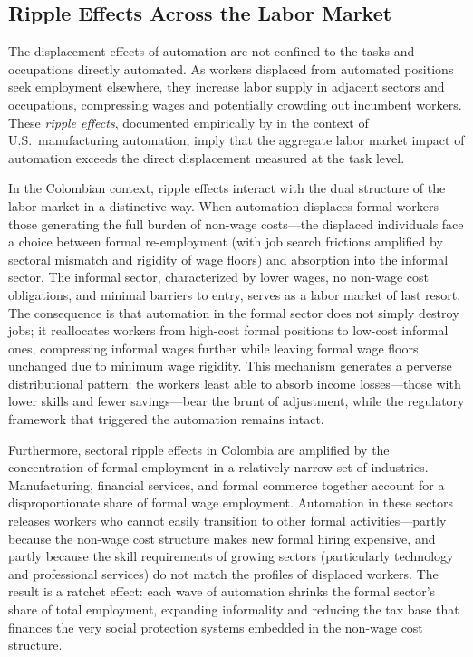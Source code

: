\documentclass{article}
\begin{document}
\subsection{Ripple Effects Across the Labor Market}
\label{subsec:ripples}

The displacement effects of automation are not confined to the tasks and occupations directly automated. As workers displaced from automated positions seek employment elsewhere, they increase labor supply in adjacent sectors and occupations, compressing wages and potentially crowding out incumbent workers. These \textit{ripple effects}, documented empirically by \cite{acemoglu2020robots} in the context of U.S.\ manufacturing automation, imply that the aggregate labor market impact of automation exceeds the direct displacement measured at the task level.

In the Colombian context, ripple effects interact with the dual structure of the labor market in a distinctive way. When automation displaces formal workers---those generating the full burden of non-wage costs---the displaced individuals face a choice between formal re-employment (with job search frictions amplified by sectoral mismatch and rigidity of wage floors) and absorption into the informal sector. The informal sector, characterized by lower wages, no non-wage cost obligations, and minimal barriers to entry, serves as a labor market of last resort. The consequence is that automation in the formal sector does not simply destroy jobs; it reallocates workers from high-cost formal positions to low-cost informal ones, compressing informal wages further while leaving formal wage floors unchanged due to minimum wage rigidity. This mechanism generates a perverse distributional pattern: the workers least able to absorb income losses---those with lower skills and fewer savings---bear the brunt of adjustment, while the regulatory framework that triggered the automation remains intact.

Furthermore, sectoral ripple effects in Colombia are amplified by the concentration of formal employment in a relatively narrow set of industries. Manufacturing, financial services, and formal commerce together account for a disproportionate share of formal wage employment. Automation in these sectors releases workers who cannot easily transition to other formal activities---partly because the non-wage cost structure makes new formal hiring expensive, and partly because the skill requirements of growing sectors (particularly technology and professional services) do not match the profiles of displaced workers. The result is a ratchet effect: each wave of automation shrinks the formal sector's share of total employment, expanding informality and reducing the tax base that finances the very social protection systems embedded in the non-wage cost structure.
\end{document}
